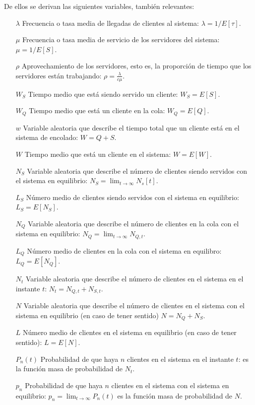 \documentclass[a4paper,10pt]{scrartcl}
\theoremstyle{definition}
\numberwithin{equation}{section}
\begin{document}
De ellos se derivan las siguientes variables, también relevantes:
\begin{itemize}
\item [$\lambda$]
  Frecuencia o tasa media de llegadas de clientes al sistema: $\lambda = 1/E[\tau]$.
\item [$\mu$]
  Frecuencia o tasa media de servicio de los servidores del sistema: $\mu = 1/E[S]$.
\item [$\rho$]
  Aprovechamiento de los servidores, esto es, la proporción de tiempo que los servidores están trabajando: $\rho = \frac{\lambda}{c\mu}$.
\item [$W_S$]
  Tiempo medio que está siendo servido un cliente: $W_S  = E[S]$.
\item [$W_Q$]
  Tiempo medio que está un cliente en la cola: $W_Q = E[Q]$.
\item [$w$]
  Variable aleatoria que describe el tiempo total que un cliente está en el sistema de encolado: $W = Q+S$.
\item [$W$]
  Tiempo medio que está un cliente en el sistema: $W = E[W]$.
\item [$N_S$]
  Variable aleatoria que describe el número de clientes siendo servidos con el sistema en equilibrio: $N_S = \lim_{t \rightarrow \infty} N_s[t]$.
\item [$L_S$]
  Número medio de clientes siendo servidos con el sistema en equilibrio: \\ $L_S = E[N_S]$.
\item [$N_Q$]
  Variable aleatoria que describe el número de clientes en la cola con el sistema en equilibrio: $N_Q = \lim_{t \rightarrow \infty} N_{Q,t}$.
\item [$L_Q$]
  Número medio de clientes en la cola con el sistema en equilibro: $L_Q = E[N_Q]$.
\item [$N_t$]
  Variable aleatoria que describe el número de clientes en el sistema en el instante $t$: $N_t = N_{Q,t} + N_{S,t}$.
\item [$N$]
  Variable aleatoria que describe el número de clientes en el sistema con el sistema en equilibrio (en caso de tener sentido) $N = N_Q + N_S$.
\item [$L$]
  Número medio de clientes en el sistema en equilibrio (en caso de tener sentido): $L = E[N]$.
\item [$P_n(t)$]
  Probabilidad de que haya $n$ clientes en el sistema en el instante $t$: es la función masa de probabilidad de $N_t$.
\item [$p_n$]
  Probabilidad de que haya $n$ clientes en el sistema con el sistema en equilibrio: $p_n = \lim_{t \rightarrow \infty} P_n(t)$ es la función masa de probabilidad de $N$.
\end{itemize}
\end{document}
